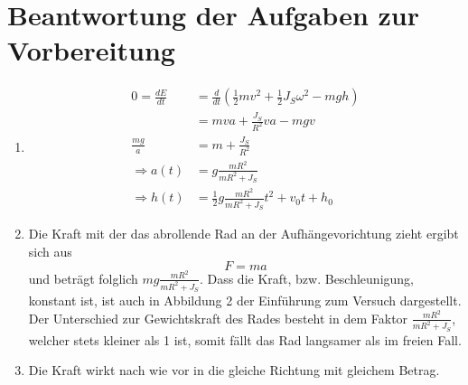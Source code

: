 \documentclass[
	a4paper,
	12pt,
	pagesize,
	ngerman
]{scrartcl}
\begin{document}
	\section{Beantwortung der Aufgaben zur Vorbereitung}
	\begin{enumerate}
		\item 
			\begin{align}
				0 = \frac{dE}{dt} &= \frac{d}{dt}(\frac{1}{2} m v^2 + \frac{1}{2} J_S \omega^2 - mgh) \\
				&= mva + \frac{J_S}{R^2}va - mgv\\
				\frac{mg}{a} &= m + \frac{J_S}{R^2} \\
				\Rightarrow a(t) &= g \frac{mR^2}{mR^2+J_S} \\
				\Rightarrow h(t) &= \frac{1}{2} g\frac{mR^2}{mR^2+J_S} t^2 + v_0t + h_0
			\end{align}
		\item
			Die Kraft mit der das abrollende Rad an der Aufhängevorichtung zieht ergibt sich aus 
			\begin{equation}
				F = ma
			\end{equation}
			und beträgt folglich $mg\frac{mR^2}{mR^2+J_S}$. 
			Dass die Kraft, bzw. Beschleunigung, konstant ist, ist auch in Abbildung 2 der Einführung zum Versuch dargestellt. 
			Der Unterschied zur Gewichtskraft des Rades besteht in dem Faktor $\frac{mR^2}{mR^2+J_S}$, welcher stets kleiner als 1 ist, somit fällt das Rad langsamer als im freien Fall.
		\item
			Die Kraft wirkt nach wie vor in die gleiche Richtung mit gleichem Betrag.
	\end{enumerate}
\end{document}
